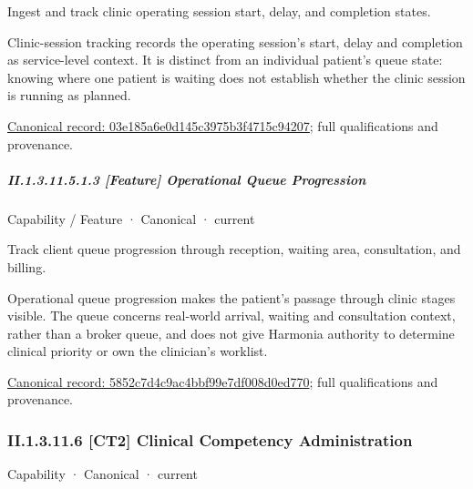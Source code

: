 Ingest and track clinic operating session start, delay, and completion states.



Clinic-session tracking records the operating session's start, delay and completion as service-level context. It is distinct from an individual patient's queue state: knowing where one patient is waiting does not establish whether the clinic session is running as planned.


{\footnotesize \href{../../../../continuum/strategy/capability/feature/03e185a6e0d145c3975b3f4715c94207.md}{Canonical record: 03e185a6e0d145c3975b3f4715c94207}; full qualifications and provenance.}\par
\subparagraph*{II.1.3.11.5.1.3 [Feature] Operational Queue Progression}
\label{navigation:II.1.3.11.5.1.3}

\label{element:5852c7d4c9ac4bbf99e7df008d0ed770}
{\small Capability / Feature · Canonical · current}\par

Track client queue progression through reception, waiting area, consultation, and billing.



Operational queue progression makes the patient's passage through clinic stages visible. The queue concerns real-world arrival, waiting and consultation context, rather than a broker queue, and does not give Harmonia authority to determine clinical priority or own the clinician's worklist.


{\footnotesize \href{../../../../continuum/strategy/capability/feature/5852c7d4c9ac4bbf99e7df008d0ed770.md}{Canonical record: 5852c7d4c9ac4bbf99e7df008d0ed770}; full qualifications and provenance.}\par
\subsubsection*{II.1.3.11.6 [CT2] Clinical Competency Administration}
\label{navigation:II.1.3.11.6}

\label{element:8a99f4a6e5054d6c997bacec04805c01}
{\small Capability · Canonical · current}\par

